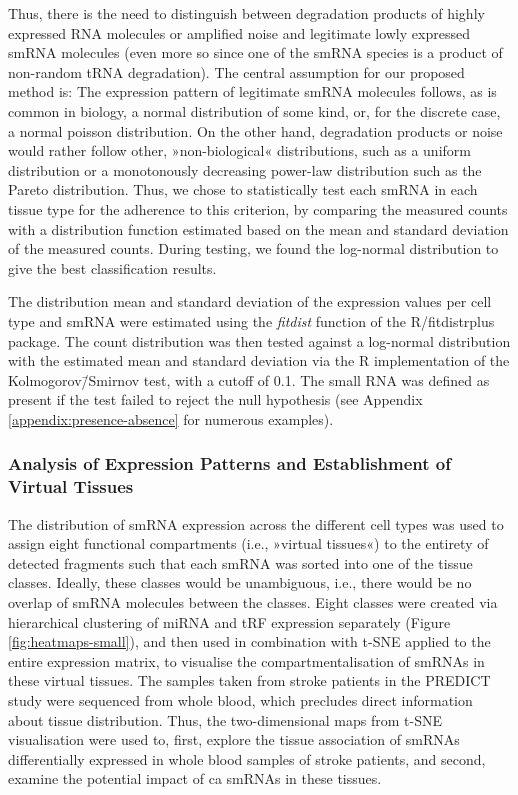 \begin{method}
Thus, there is the need to distinguish between degradation products of highly expressed RNA molecules or amplified noise and legitimate lowly expressed smRNA molecules (even more so since one of the smRNA species is a product of non-random tRNA degradation). The central assumption for our proposed method is: The expression pattern of legitimate smRNA molecules follows, as is common in biology, a normal distribution of some kind, or, for the discrete case, a normal poisson distribution. On the other hand, degradation products or noise would rather follow other, »non-biological« distributions, such as a uniform distribution or a monotonously decreasing power-law distribution such as the Pareto distribution. Thus, we chose to statistically test each smRNA in each tissue type for the adherence to this criterion, by comparing the measured counts with a distribution function estimated based on the mean and standard deviation of the measured counts. During testing, we found the log-normal distribution to give the best classification results.
 
The distribution mean and standard deviation of the expression values per cell type and smRNA were estimated using the \emph{fitdist} function of the R/fitdistrplus package.\cite{Delignette-Muller2015} The count distribution was then tested against a log-normal distribution with the estimated mean and standard deviation via the R implementation of the Kolmogorov\=/Smirnov test, with a cutoff of 0.1. The small RNA was defined as present if the test failed to reject the null hypothesis (see Appendix \ref{appendix:presence-absence} for numerous examples).

\subsubsection{Analysis of Expression Patterns and Establishment of Virtual Tissues}
The distribution of smRNA expression across the different cell types was used to assign eight functional compartments (i.e., »virtual tissues«) to the entirety of detected fragments such that each smRNA was sorted into one of the tissue classes. Ideally, these classes would be unambiguous, i.e., there would be no overlap of smRNA molecules between the classes. Eight classes were created via hierarchical clustering of miRNA and tRF expression separately (Figure \ref{fig:heatmaps-small}), and then used in combination with t-SNE applied to the entire expression matrix, to visualise the compartmentalisation of smRNAs in these virtual tissues. The samples taken from stroke patients in the PREDICT study were sequenced from whole blood, which precludes direct information about tissue distribution. Thus, the two-dimensional maps from t-SNE visualisation were used to, first, explore the tissue association of smRNAs differentially expressed in whole blood samples of stroke patients, and second, examine the potential impact of \acl{ca} smRNAs in these tissues.

\end{method}

